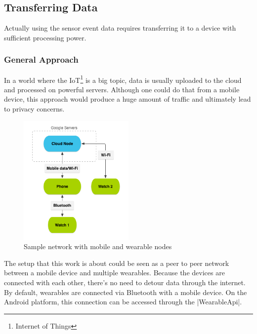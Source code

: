 \clearpage

\subsection{Transferring Data}
\label{sec:implementation:transferringdata}
Actually using the sensor event data requires transferring it to a device with sufficient processing power.

\subsubsection{General Approach}
In a world where the IoT\footnote{Internet of Things} is a big topic, data is usually uploaded to the cloud and processed on powerful servers.
Although one could do that from a mobile device, this approach would produce a huge amount of traffic and ultimately lead to privacy concerns.

\begin{figure}[H]
	\centering
	\includegraphics[width=0.5\textwidth]{images/wear_cloud_node.png}
	\caption[Caption for wear_cloud_node]{Sample network with mobile and wearable nodes\footnotemark}
	\label{fig:nodeNetwork}
\end{figure}

\clearpage

The setup that this work is about could be seen as a peer to peer network between a mobile device and multiple wearables.
Because the devices are connected with each other, there's no need to detour data through the internet.
By default, wearables are connected via Bluetooth with a mobile device.
On the Android platform, this connection can be accessed through the |WearableApi|\cite{androiddocs:wearable}.

